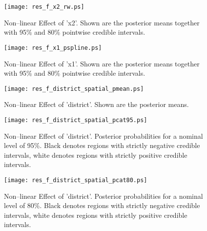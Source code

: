 \documentclass[a4paper, 12pt]{article}
\begin{document}
\newpage
{}

\begin{figure}[h!]
\centering
\texttt{[image: res\_f\_x2\_rw.ps]}
\caption{Non--linear Effect of 'x2'.
Shown are the posterior means together with 95\% and 80\% pointwise credible intervals.}
\end{figure}

\begin{figure}[h!]
\centering
\texttt{[image: res\_f\_x1\_pspline.ps]}
\caption{Non--linear Effect of 'x1'.
Shown are the posterior means together with 95\% and 80\% pointwise credible intervals.}
\end{figure}

\begin{figure}[h!]
\centering
\texttt{[image: res\_f\_district\_spatial\_pmean.ps]}
\caption{Non--linear Effect of 'district'. Shown are the posterior means.}
\end{figure}

\begin{figure}[htb]
\centering
\texttt{[image: res\_f\_district\_spatial\_pcat95.ps]}
\caption{Non--linear Effect of 'district'. Posterior probabilities for a nominal level of 95\%.
Black denotes regions with strictly negative credible intervals,
white denotes regions with strictly positive credible intervals.}
\end{figure}

\begin{figure}[htb]
\centering
\texttt{[image: res\_f\_district\_spatial\_pcat80.ps]}
\caption{Non--linear Effect of 'district'. Posterior probabilities for a nominal level of 80\%.
Black denotes regions with strictly negative credible intervals,
white denotes regions with strictly positive credible intervals.}
\end{figure}
\end{document}
